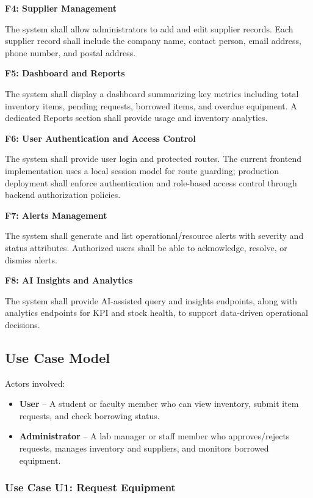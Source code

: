 \documentclass[12pt]{article}
\begin{document}
\textbf{F4: Supplier Management}

The system shall allow administrators to add and edit supplier records. Each supplier record shall include the company name, contact person, email address, phone number, and postal address.

\textbf{F5: Dashboard and Reports}

The system shall display a dashboard summarizing key metrics including total inventory items, pending requests, borrowed items, and overdue equipment. A dedicated Reports section shall provide usage and inventory analytics.

\textbf{F6: User Authentication and Access Control}

The system shall provide user login and protected routes. The current frontend implementation uses a local session model for route guarding; production deployment shall enforce authentication and role-based access control through backend authorization policies.

\textbf{F7: Alerts Management}

The system shall generate and list operational/resource alerts with severity and status attributes. Authorized users shall be able to acknowledge, resolve, or dismiss alerts.

\textbf{F8: AI Insights and Analytics}

The system shall provide AI-assisted query and insights endpoints, along with analytics endpoints for KPI and stock health, to support data-driven operational decisions.

\subsection{Use Case Model}

Actors involved:

\begin{itemize}
\item \textbf{User} -- A student or faculty member who can view inventory, submit item requests, and check borrowing status.
\item \textbf{Administrator} -- A lab manager or staff member who approves/rejects requests, manages inventory and suppliers, and monitors borrowed equipment.
\end{itemize}

\subsubsection{Use Case U1: Request Equipment}
\end{document}
